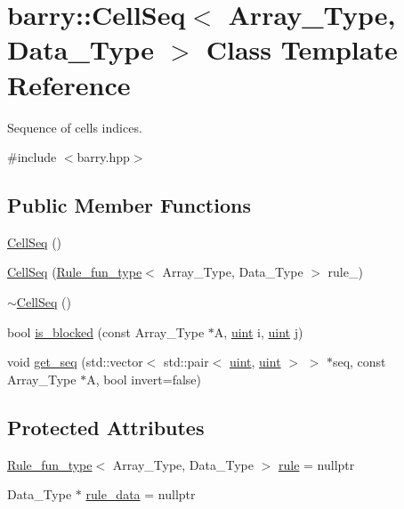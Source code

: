 \hypertarget{classbarry_1_1_cell_seq}{}\section{barry\+:\+:Cell\+Seq$<$ Array\+\_\+\+Type, Data\+\_\+\+Type $>$ Class Template Reference}
\label{classbarry_1_1_cell_seq}


Sequence of cells indices.  




{\ttfamily \#include $<$barry.\+hpp$>$}

\subsection*{Public Member Functions}
\begin{DoxyCompactItemize}
\item 
\hyperlink{classbarry_1_1_cell_seq_a7e9250af55622cdf1429d23e1052635c}{Cell\+Seq} ()
\item 
\hyperlink{classbarry_1_1_cell_seq_af7ea37359c8cd87e45394482b7e27b41}{Cell\+Seq} (\hyperlink{namespacebarry_aefd7e6d4ba228e2ce1074d075c512178}{Rule\+\_\+fun\+\_\+type}$<$ Array\+\_\+\+Type, Data\+\_\+\+Type $>$ rule\+\_\+)
\item 
\hyperlink{classbarry_1_1_cell_seq_a8cb52b7bdcc9181df159a049c60d04f9}{$\sim$\+Cell\+Seq} ()
\item 
bool \hyperlink{classbarry_1_1_cell_seq_a32d85d2f118a68b58d1f7a6095ff42ca}{is\+\_\+blocked} (const Array\+\_\+\+Type $\ast$A, \hyperlink{namespacebarry_a11dfc53ddb4672278319aa04f1e09a6c}{uint} i, \hyperlink{namespacebarry_a11dfc53ddb4672278319aa04f1e09a6c}{uint} j)
\item 
void \hyperlink{classbarry_1_1_cell_seq_a844b28a2053fd2c6810340a5a9aef945}{get\+\_\+seq} (std\+::vector$<$ std\+::pair$<$ \hyperlink{namespacebarry_a11dfc53ddb4672278319aa04f1e09a6c}{uint}, \hyperlink{namespacebarry_a11dfc53ddb4672278319aa04f1e09a6c}{uint} $>$ $>$ $\ast$seq, const Array\+\_\+\+Type $\ast$A, bool invert=false)
\end{DoxyCompactItemize}
\subsection*{Protected Attributes}
\begin{DoxyCompactItemize}
\item 
\hyperlink{namespacebarry_aefd7e6d4ba228e2ce1074d075c512178}{Rule\+\_\+fun\+\_\+type}$<$ Array\+\_\+\+Type, Data\+\_\+\+Type $>$ \hyperlink{classbarry_1_1_cell_seq_a57dfbe0d6e42b3828cb8d0ba8ddc8640}{rule} = nullptr
\item 
Data\+\_\+\+Type $\ast$ \hyperlink{classbarry_1_1_cell_seq_ad8d6cd5a38746d02d98f4fc8b7624863}{rule\+\_\+data} = nullptr
\end{DoxyCompactItemize}


